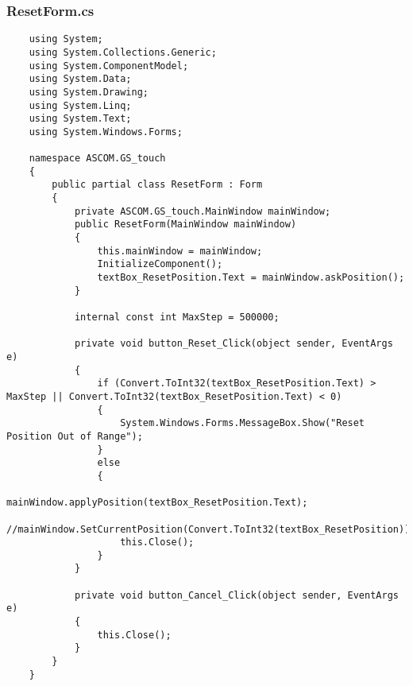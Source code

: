 \subsubsection{ResetForm.cs}
\begin{lstlisting}
	using System;
	using System.Collections.Generic;
	using System.ComponentModel;
	using System.Data;
	using System.Drawing;
	using System.Linq;
	using System.Text;
	using System.Windows.Forms;
	
	namespace ASCOM.GS_touch
	{
		public partial class ResetForm : Form
		{
			private ASCOM.GS_touch.MainWindow mainWindow;
			public ResetForm(MainWindow mainWindow)
			{
				this.mainWindow = mainWindow;
				InitializeComponent();
				textBox_ResetPosition.Text = mainWindow.askPosition();
			}
			
			internal const int MaxStep = 500000;
			
			private void button_Reset_Click(object sender, EventArgs e)
			{
				if (Convert.ToInt32(textBox_ResetPosition.Text) > MaxStep || Convert.ToInt32(textBox_ResetPosition.Text) < 0)
				{
					System.Windows.Forms.MessageBox.Show("Reset Position Out of Range");
				}
				else
				{
					mainWindow.applyPosition(textBox_ResetPosition.Text);
					//mainWindow.SetCurrentPosition(Convert.ToInt32(textBox_ResetPosition));
					this.Close();
				}
			}
			
			private void button_Cancel_Click(object sender, EventArgs e)
			{
				this.Close();
			}
		}
	}
	
\end{lstlisting}
